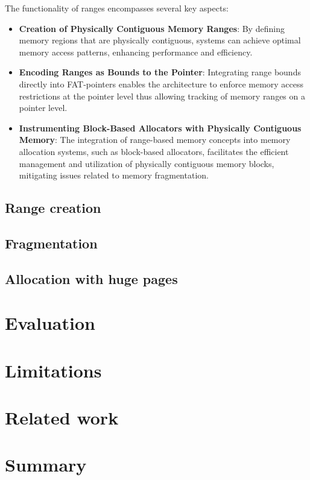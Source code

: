 \documentclass[acmsmall,screen,review]{acmart}
\begin{document}
The functionality of ranges encompasses several key aspects:
\begin{itemize}
\item \textbf{Creation of Physically Contiguous Memory Ranges}:
By defining memory regions that are physically contiguous, systems can 
achieve optimal memory access patterns, enhancing performance and efficiency.
\item \textbf{Encoding Ranges as Bounds to the Pointer}:
Integrating range bounds directly into FAT-pointers enables the architecture 
to enforce memory access restrictions at the pointer level thus allowing 
tracking of memory ranges on a pointer level.
\item \textbf{Instrumenting Block-Based Allocators with Physically Contiguous Memory}:
The integration of range-based memory concepts into memory allocation systems, such as block-based 
allocators, facilitates the efficient management and utilization of physically contiguous memory blocks, 
mitigating issues related to memory fragmentation.
\end{itemize}

\subsection{Range creation}

\subsection{Fragmentation}

\subsection{Allocation with huge pages}

\section{Evaluation}

\section{Limitations}

\section{Related work}


\section{Summary}
\end{document}
